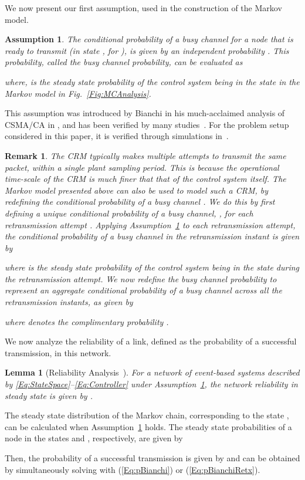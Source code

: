 \documentclass[twocolumn]{autart}
\newtheorem{lemma}[theorem]{Lemma}
\newtheorem{assumption}{Assumption}[section]
\newtheorem{remark}{Remark}[section]
\newenvironment{proof}[1][Proof]{\begin{trivlist}
\item[\hskip \labelsep {\bfseries #1}]}{\end{trivlist}}
\renewcommand{\qed}{}
\begin{document}
We now present our first assumption, used in the construction of the Markov model.
\begin{assumption}\textbf{} \label{Assume:Bianchi}
The conditional probability of a busy channel for a node that is ready to transmit (in state , for ), is given by an independent probability . This probability, called the busy channel probability, can be evaluated as

where,  is the steady state probability of the  control system being in the state  in the Markov model in Fig.~\ref{Fig:MCAnalysis}.
\end{assumption}

This assumption was introduced by Bianchi in his much-acclaimed analysis of CSMA/CA in , and has been verified by many studies~\cite{Bianchi2000,Ramachandran2007,Pollin2008}. For the problem setup considered in this paper, it is verified through simulations in~\cite{Ramesh2011b}.
\begin{remark}\textbf{} \label{Remark:Retx}
The CRM typically makes multiple attempts to transmit the same packet, within a single plant sampling period. This is because the operational time-scale of the CRM is much finer that that of the control system itself. The Markov model presented above can also be used to model such a CRM, by redefining the conditional probability of a busy channel . We do this by first defining a unique conditional probability of a busy channel, , for each retransmission attempt . Applying Assumption~\ref{Assume:Bianchi} to each retransmission attempt, the conditional probability of a busy channel in the  retransmission instant is given by

where  is the steady state probability of the  control system being in the state  during the  retransmission attempt. We now redefine the busy channel probability  to represent an aggregate conditional probability of a busy channel across all the retransmission instants, as given by

where  denotes the complimentary probability .
\end{remark}

We now analyze the reliability of a link, defined as the probability of a successful transmission, in this network.
\begin{lemma}[Reliability Analysis~\cite{Ramesh2011b}] \label{Lemma:RelAnal}
For a network of event-based systems described by \eqref{Eq:StateSpace}--\eqref{Eq:Controller} under Assumption~\ref{Assume:Bianchi}, the network reliability in steady state is given by .
\end{lemma}
\begin{proof}
The steady state distribution of the Markov chain,  corresponding to the state , can be calculated when Assumption~\ref{Assume:Bianchi} holds. The steady state probabilities of a node in the states  and , respectively, are given by

Then, the probability of a successful transmission is given by  and can be obtained by simultaneously solving  with (\ref{Eq:pBianchi}) or (\ref{Eq:pBianchiRetx}). \hfill \qed
\end{proof}
\end{document}
